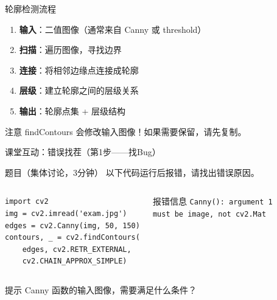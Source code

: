 \begin{frame}{轮廓检测流程}
    \begin{enumerate}
        \item \textbf{输入}：二值图像（通常来自 Canny 或 threshold）
        \item \textbf{扫描}：遍历图像，寻找边界
        \item \textbf{连接}：将相邻边缘点连接成轮廓
        \item \textbf{层级}：建立轮廓之间的层级关系
        \item \textbf{输出}：轮廓点集 + 层级结构
    \end{enumerate}

    \vspace{0.3cm}

    \begin{alertblock}{注意}
        findContours 会修改输入图像！如果需要保留，请先复制。
    \end{alertblock}
\end{frame}

\begin{frame}[fragile]{课堂互动：错误找茬（第1步——找Bug）}
    \begin{block}{题目（集体讨论，3分钟）}
        以下代码运行后报错，请找出错误原因。
    \end{block}

    \pause

    \begin{columns}
        \begin{lstlisting}[basicstyle=\ttfamily\scriptsize]
import cv2
img = cv2.imread('exam.jpg')
edges = cv2.Canny(img, 50, 150)
contours, _ = cv2.findContours(
    edges, cv2.RETR_EXTERNAL,
    cv2.CHAIN_APPROX_SIMPLE)
        \end{lstlisting}

        \begin{alertblock}{报错信息}
            \texttt{Canny(): argument 1}\\
            \texttt{must be image, not cv2.Mat}
        \end{alertblock}
    \end{columns}

    \pause

    \begin{uncoverenv}
        \begin{block}{提示}
            Canny 函数的输入图像，需要满足什么条件？
        \end{block}
    \end{uncoverenv}

\end{frame}

